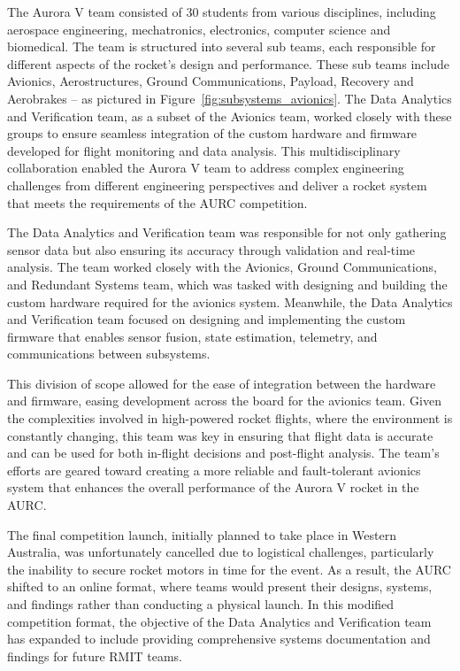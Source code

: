 The Aurora V team consisted of 30 students from various disciplines, including aerospace engineering, mechatronics, electronics, computer science and biomedical. The team is structured into several sub teams, each responsible for different aspects of the rocket’s design and performance. These sub teams include Avionics, Aerostructures, Ground Communications, Payload, Recovery and Aerobrakes -- as pictured in Figure~\ref{fig:subsystems_avionics}. The Data Analytics and Verification team, as a subset of the Avionics team, worked closely with these groups to ensure seamless integration of the custom hardware and firmware developed for flight monitoring and data analysis. This multidisciplinary collaboration enabled the Aurora V team to address complex engineering challenges from different engineering perspectives and deliver a rocket system that meets the requirements of the AURC competition. 

The Data Analytics and Verification team was responsible for not only gathering sensor data but also ensuring its accuracy through validation and real-time analysis. The team worked closely with the Avionics, Ground Communications, and Redundant Systems team, which was tasked with designing and building the custom hardware required for the avionics system. Meanwhile, the Data Analytics and Verification team focused on designing and implementing the custom firmware that enables sensor fusion, state estimation, telemetry, and communications between subsystems. 

This division of scope allowed for the ease of integration between the hardware and firmware, easing development across the board for the avionics team. Given the complexities involved in high-powered rocket flights, where the environment is constantly changing, this team was key in ensuring that flight data is accurate and can be used for both in-flight decisions and post-flight analysis. The team’s efforts are geared toward creating a more reliable and fault-tolerant avionics system that enhances the overall performance of the Aurora V rocket in the AURC. 

The final competition launch, initially planned to take place in Western Australia, was unfortunately cancelled due to logistical challenges, particularly the inability to secure rocket motors in time for the event. As a result, the AURC shifted to an online format, where teams would present their designs, systems, and findings rather than conducting a physical launch. In this modified competition format, the objective of the Data Analytics and Verification team has expanded to include providing comprehensive systems documentation and findings for future RMIT teams. 

